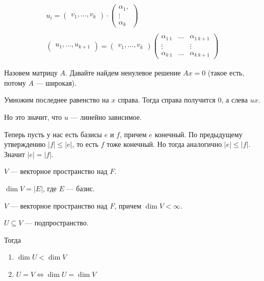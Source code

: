 \begin{gather*}
    u_i
    =
    \begin{pmatrix}
        v_1, \ldots, v_k
    \end{pmatrix}
    \cdot
    \begin{pmatrix}
        \alpha_1,
        \\
        \vdots
        \\
        \alpha_k
    \end{pmatrix}
    \\
    \\
    \begin{pmatrix}
        u_1, \ldots, u_{k + 1}
    \end{pmatrix}
    =
    \begin{pmatrix}
        v_1, \ldots, v_k
    \end{pmatrix}
    \begin{pmatrix}
        \alpha_{1 \: 1} & \ldots & \alpha_{1 \: {k + 1}}
        \\
        \vdots & & \vdots
        \\
        \alpha_{k \: 1} & \ldots& \alpha_{k \: {k + 1}}
    \end{pmatrix}
\end{gather*}

Назовем матрицу \( A \). Давайте найдем ненулевое решение \( Ax = 0\)
(такое есть, потому \( A \) --- широкая).

Умножим последнее равенство на \( x \) справа.
Тогда справа получится \( 0 \),
а слева \( ux \).

Но это значит, что \( u \) --- линейно зависимое.

Теперь пусть у нас есть базисы \( e \) и \( f \), причем \( e \) конечный.
По предыдущему утверждению \( |f| \leq |e| \), то есть \( f \) тоже конечный.
Но тогда аналогично \( |e| \leq |f| \). Значит \( |e| = |f| \).

\begin{defn}{}{}
    \( V \) --- векторное пространство над \( F \).

    \( \dim V = |E| \), где \( E \) --- базис.
\end{defn}


\begin{lemma}{}{}
    \( V \) --- векторное пространство над \( F \), причем \( \dim V < \infty \).

    \( U \subseteq V \) --- подпространство.

    Тогда
    \begin{enumerate}
        \item
            \( \dim U < \dim V \)
        \item
            \( U = V \Leftrightarrow \dim U = \dim V \)
    \end{enumerate}
\end{lemma}

